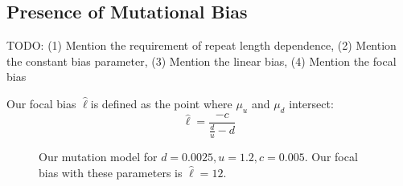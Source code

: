 \subsection{Presence of Mutational Bias}\label{subsec:pomb}
TODO: (1) Mention the requirement of repeat length dependence, (2) Mention the constant bias parameter,
(3) Mention the linear bias, (4) Mention the focal bias

Our focal bias $\hat{\ell} $is defined as the point where $\mu_u$ and $\mu_d$ intersect:
\begin{equation}
    \hat{\ell} = \frac{-c}{\frac{d}{u} - d}
\end{equation}

\begin{figure}
    \centering{}
    \caption{Our mutation model for $d=0.0025, u=1.2, c=0.005$.
    Our focal bias with these parameters is $\hat{\ell}=12$.}\label{fig:mutationModel}
\end{figure}